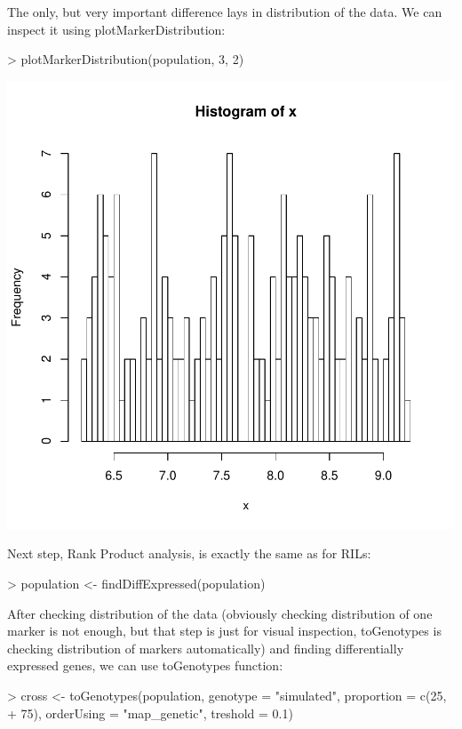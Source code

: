 \documentclass{article}
\begin{document}
{\noindent}The only, but very important difference lays in distribution of the data. We can inspect it using plotMarkerDistribution:
\begin{Schunk}
\begin{Sinput}
> plotMarkerDistribution(population, 3, 2)
\end{Sinput}
\end{Schunk}
\includegraphics{manual-016}

{\noindent}Next step, Rank Product analysis, is exactly the same as for RILs:
\begin{Schunk}
\begin{Sinput}
> population <- findDiffExpressed(population)
\end{Sinput}
\end{Schunk}

\newpage
{\noindent}After checking distribution of the data (obviously checking distribution of one marker is not enough, but that step is just for visual inspection, toGenotypes is
checking distribution of markers automatically) and finding differentially expressed genes, we can use toGenotypes function:
\begin{Schunk}
\begin{Sinput}
> cross <- toGenotypes(population, genotype = "simulated", proportion = c(25, 
+     75), orderUsing = "map_genetic", treshold = 0.1)
\end{Sinput}
\end{Schunk}
\end{document}
